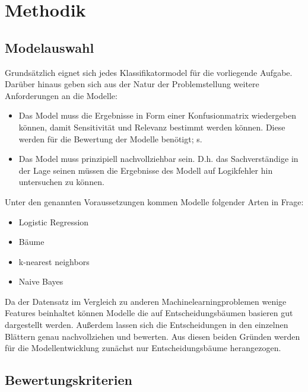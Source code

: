\chapter{Methodik}
\label{ch:methodik}

\section{Modelauswahl}
\label{sec:modelauswahl}

Grundsätzlich eignet sich jedes Klassifikatormodel für die vorliegende Aufgabe. Darüber hinaus geben sich aus der Natur der Problemstellung weitere Anforderungen an die Modelle:

\begin{itemize}
    \item Das Model muss die Ergebnisse in Form einer Konfusionmatrix wiedergeben können, damit Sensitivität und Relevanz bestimmt werden können.  Diese werden für die Bewertung der Modelle benötigt; s. 
    \item Das Model muss prinzipiell nachvollziehbar sein. D.h. das Sachverständige in der Lage seinen müssen die Ergebnisse des Modell auf Logikfehler hin untersuchen zu können. 
\end{itemize}

Unter den genannten Voraussetzungen kommen Modelle folgender Arten in Frage:
\begin{itemize}
    \item Logistic Regression
    \item Bäume
    \item k-nearest neighbors
    \item Naive Bayes
\end{itemize}

Da der Datensatz im Vergleich zu anderen Machinelearningproblemen wenige Features beinhaltet  können Modelle die auf Entscheidungsbäumen basieren gut dargestellt werden. Außerdem lassen sich die Entscheidungen in den einzelnen Blättern genau nachvollziehen und bewerten. Aus diesen beiden Gründen werden für die Modellentwicklung zunächst nur Entscheidungsbäume herangezogen. 

\section{Bewertungskriterien}
\label{sec:bewertungskriterien}

